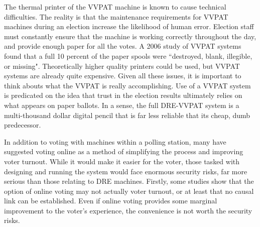 \documentclass[12pt, titlepage]{article}
\begin{document}
The thermal printer of the VVPAT machine is known to cause technical difficulties. The reality is that the maintenance requirements for VVPAT machines during an election increase the likelihood of human error. Election staff must constantly ensure that the machine is working correctly throughout the day, and provide enough paper for all the votes. A 2006 study of VVPAT systems found that a full 10 percent of the paper spools were ``destroyed, blank, illegible, or missing". \cite{goggin2007examination} Theoretically higher quality printers could be used, but VVPAT systems are already quite expensive. Given all these issues, it is important to think abouts what the VVPAT is really accomplishing. Use of a VVPAT system is predicated on the idea that trust in the election results ultimately relies on what appears on paper ballots. In a sense, the full DRE-VVPAT system is a multi-thousand dollar digital pencil that is far less reliable that its cheap, dumb predecessor.

In addition to voting with machines within a polling station, many have suggested voting online as a method of simplifying the process and improving voter turnout. While it would make it easier for the voter, those tasked with designing and running the system would face enormous security risks, far more serious than those relating to DRE machines. Firstly, some studies show that the option of online voting may not actually voter turnout, or at least that no causal link can be established. \cite{germann2017internet} \cite{estonianturnout} Even if online voting provides some marginal improvement to the voter's experience, the convenience is not worth the security risks. 
\end{document}
